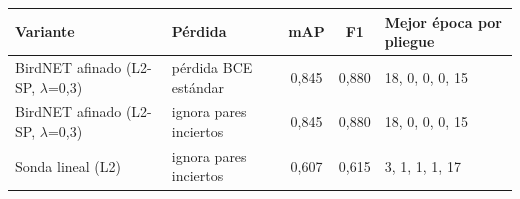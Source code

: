 \begin{tabular}{llccl}
\toprule
Variante & Pérdida & mAP & F1 & Mejor época por pliegue\\
\midrule
BirdNET afinado (L2-SP, $\lambda$=0,3) & pérdida BCE estándar & 0{,}845 & 0{,}880 & 18, 0, 0, 0, 15\\
BirdNET afinado (L2-SP, $\lambda$=0,3) & ignora pares inciertos & 0{,}845 & 0{,}880 & 18, 0, 0, 0, 15\\
Sonda lineal (L2) & ignora pares inciertos & 0{,}607 & 0{,}615 & 3, 1, 1, 1, 17\\
\bottomrule
\end{tabular}

